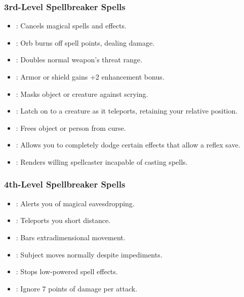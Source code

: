 \subsubsection{3rd-Level Spellbreaker Spells}
\begin{itemize}
  \item {}: Cancels magical spells and effects.
  \item {}: Orb burns off spell points, dealing damage.
  \item {}: Doubles normal weapon's threat range.
  \item {}: Armor or shield gains +2 enhancement bonus.
  \item {}: Masks object or creature against scrying.
  \item {}: Latch on to a creature as it teleports, retaining your relative position.
  \item {}: Frees object or person from curse.
  \item {}: Allows you to completely dodge certain effects that allow a reflex save.
  \item {}: Renders willing spellcaster incapable of casting spells.
\end{itemize}
\subsubsection{4th-Level Spellbreaker Spells}
\begin{itemize}
  \item {}: Alerts you of magical eavesdropping.
  \item {}: Teleports you short distance.
  \item {}: Bars extradimensional movement.
  \item {}: Subject moves normally despite impediments.
  \item {}: Stops low-powered spell effects.
  \item {}: Ignore 7 points of damage per attack.
\end{itemize}
